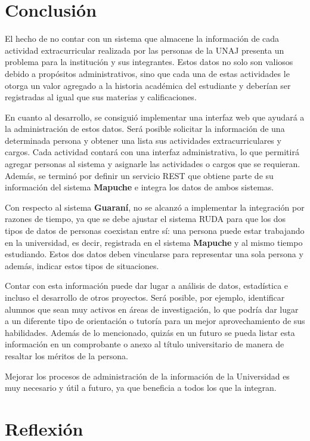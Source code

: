 
\section{Conclusión}
\label{sec:conclusion}
El hecho de no contar con un sistema que almacene la información de cada
actividad extracurricular realizada por las personas de la UNAJ presenta
un problema para la institución y sus integrantes\@. Estos datos
no solo son valiosos debido a propósitos administrativos, sino que cada una de
estas actividades le otorga un valor agregado a la historia académica del
estudiante y deberían ser registradas al igual que sus
materias y calificaciones.


En cuanto al desarrollo, se consiguió implementar una interfaz web que ayudará
a la administración de estos datos. Será posible solicitar la información de
una determinada persona y obtener una lista sus actividades extracurriculares y cargos\@.
Cada actividad contará con una interfaz administrativa, lo que
permitirá agregar personas al sistema y asignarle las actividades o cargos
que se requieran\@. Además, se terminó por definir un servicio REST que
obtiene parte de su información del sistema \textbf{Mapuche} e integra
los datos de ambos sistemas\@.


Con respecto al sistema \textbf{Guaraní}, no se alcanzó a implementar la
integración por razones de tiempo, ya que se debe ajustar el sistema RUDA para
que los dos tipos de datos de personas coexistan entre sí: una persona puede
estar trabajando en la universidad, es decir, registrada en el sistema
\textbf{Mapuche} y al mismo tiempo estudiando. Estos dos datos deben
vincularse para representar una sola persona y además, indicar estos tipos
de situaciones.

Contar con esta información puede dar lugar a análisis de datos,
estadística e incluso el desarrollo de otros proyectos. Será posible,
por ejemplo, identificar alumnos que sean muy activos en áreas de
investigación, lo que podría dar lugar a un diferente tipo de orientación
o tutoría para un mejor aprovechamiento de sus habilidades\@. Además de lo mencionado, quizás
en un futuro se pueda listar esta información en un comprobante o anexo al título universitario
de manera de resaltar los méritos de la persona.

Mejorar los procesos de administración de la información de la Universidad es muy necesario
y útil a futuro, ya que beneficia a todos los que la integran.

\section{Reflexión}%
\label{sec:reflexión}

